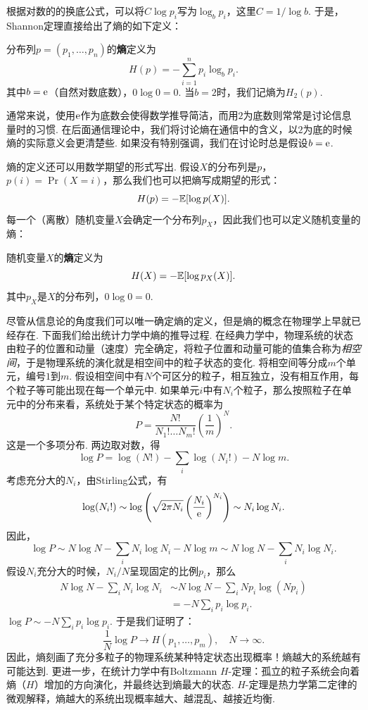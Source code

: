 根据对数的的换底公式，可以将$C\log p_i$写为$\log_bp_i$，这里$C=1/\log b$. 于是，Shannon定理直接给出了熵的如下定义：
\begin{definition}[熵]
    分布列$p=(p_1,\dots,p_n)$的\textbf{熵}定义为
    \[H(p)=-\sum_{i=1}^np_i\log_b p_i.\]
    其中$b=\mathrm{e}$（自然对数底数），$0\log 0=0$. 当$b=2$时，我们记熵为$H_2(p)$.
\end{definition}

通常来说，使用$\mathrm{e}$作为底数会使得数学推导简洁，而用$2$为底数则常常是讨论信息量时的习惯. 在后面通信理论中，我们将讨论熵在通信中的含义，以$2$为底的时候熵的实际意义会更清楚些. 如果没有特别强调，我们在讨论时总是假设$b=\mathrm{e}$.

熵的定义还可以用数学期望的形式写出. 假设$X$的分布列是$p$，$p(i)=\Pr(X=i)$，那么我们也可以把熵写成期望的形式：
\[H(p)=-\mathbb{E}[\log p(X)].\]
每一个（离散）随机变量$X$会确定一个分布列$p_X$，因此我们也可以定义随机变量的熵：
\begin{definition}[随机变量的熵]
    随机变量$X$的\textbf{熵}定义为
    \[H(X)=-\mathbb{E}[\log p_X(X)].\]
    其中$p_X$是$X$的分布列，$0\log 0=0$.
\end{definition}

尽管从信息论的角度我们可以唯一确定熵的定义，但是熵的概念在物理学上早就已经存在. 下面我们给出统计力学中熵的推导过程. 在经典力学中，物理系统的状态由粒子的位置和动量（速度）完全确定，将粒子位置和动量可能的值集合称为\emph{相空间}，于是物理系统的演化就是相空间中的粒子状态的变化. 将相空间等分成$m$个单元，编号$1$到$m$. 假设相空间中有$N$个可区分的粒子，相互独立，没有相互作用，每个粒子等可能出现在每一个单元中. 如果单元$i$中有$N_i$个粒子，那么按照粒子在单元中的分布来看，系统处于某个特定状态的概率为
    \[P=\frac{N!}{N_1!\dots N_m!}\left(\frac1m\right)^N.\]
这是一个多项分布. 两边取对数，得
    \[\log P=\log(N!)-\sum_i\log(N_i!)-N\log m.\]
考虑充分大的$N_i$，由Stirling公式，有
\begin{align*}
    \log(N_i!)\sim\log\left(\sqrt{2\pi N_i}\left(\frac{N_i}{\mathrm{e}}\right)^{N_i}\right)\sim N_i\log N_i.    
\end{align*}
因此，
\begin{equation}
    \log P\sim N\log N-\sum_i N_i\log N_i- N\log m\sim N\log N-\sum_i N_i\log N_i.\label{eq:logP}
\end{equation}
假设$N_i$充分大的时候，$N_i/N$呈现固定的比例$p_i$，那么
    \begin{align*}
        N\log N-\sum_i N_i\log N_i&\sim N\log N-\sum_i Np_i\log(Np_i)\\
        &=-N\sum_i p_i\log p_i.
    \end{align*}
 $\log P\sim -N\sum_i p_i\log p_i$. 于是我们证明了：
    \[\frac1N\log P\to H(p_1,\dots,p_m),\quad N\to\infty.\]
因此，熵刻画了充分多粒子的物理系统某种特定状态出现概率！熵越大的系统越有可能达到. 更进一步，在统计力学中有Boltzmann $H$-定理：孤立的粒子系统会向着熵（$H$）增加的方向演化，并最终达到熵最大的状态. $H$-定理是热力学第二定律的微观解释，熵越大的系统出现概率越大、越混乱、越接近均衡.

